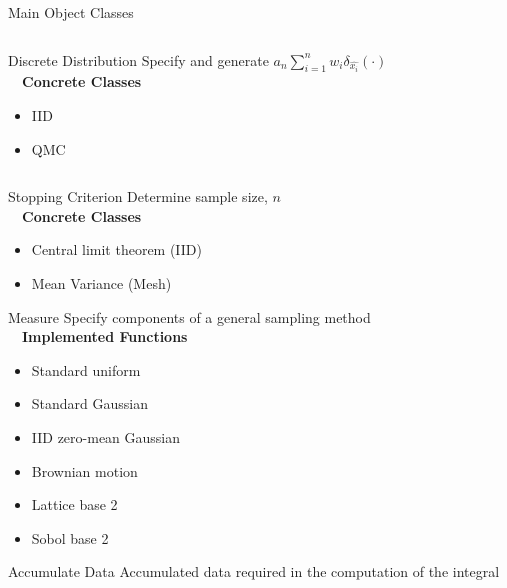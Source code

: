 \documentclass[final]{beamer}
\newlength{\onecolwid}
\newlength{\twocolwid}
\newlength{\threecolwid}
\begin{document}
\begin{frame}[t]
\begin{columns}[t]
\begin{column}{\threecolwid}
\begin{columns}[t,totalwidth=\threecolwid]
\begin{column}{\twocolwid}
\begin{block}{Main Object Classes}
\begin{column}{\onecolwid}
\begin{alertblock}{Discrete Distribution}
    Specify and generate $a_n \sum_{i=1}^n w_i \delta_{\hat{x_i}}(\cdot)$ \\[1ex]~\
    \textbf{Concrete Classes}
    \begin{itemize}
        \item IID
        \item QMC
    \end{itemize}
\end{alertblock}
\end{column} 
\begin{column}{\onecolwid}
\begin{alertblock}{Stopping Criterion}
    Determine sample size, $n$\\[1ex]~\
    \textbf{Concrete Classes}
    \begin{itemize}
        \item Central limit theorem (IID)
        \item Mean Variance (Mesh)
    \end{itemize}
\end{alertblock}

\begin{alertblock}{Measure}
    Specify components of a general sampling method \\[1ex]~\
    \textbf{Implemented Functions}
    \begin{itemize}
        \item Standard uniform
        \item Standard Gaussian
        \item IID zero-mean Gaussian
        \item Brownian motion 
        \item Lattice base 2 \cite{kuo2016application,nuyensmagic}
        \item Sobol base 2 \cite{kuo2016application,nuyensmagic}
    \end{itemize}
\end{alertblock}

\vspace{-1ex}
\begin{alertblock}{Accumulate Data}
    Accumulated data required in the computation of the integral
\end{alertblock}
\end{column}


\end{block}
\end{column}
\end{columns}
\end{column}
\end{columns}
\end{frame}
\end{document}
